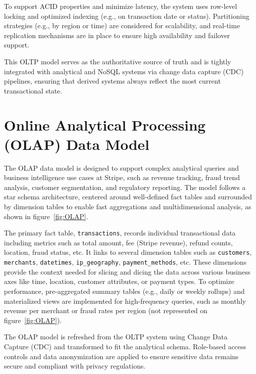 \documentclass[11pt,a4paper,computermodern]{article}
\newcommand{\code}{\texttt}
\begin{document}
To support ACID properties and minimize latency, the system uses row-level locking and optimized indexing (e.g., on transaction date or status). Partitioning strategies (e.g., by region or time) are considered for scalability, and real-time replication mechanisms are in place to ensure high availability and failover support.

This OLTP model serves as the authoritative source of truth and is tightly integrated with analytical and NoSQL systems via change data capture (CDC) pipelines, ensuring that derived systems always reflect the most current transactional state.


\clearpage
\section*{Online Analytical Processing (OLAP) Data Model}

The OLAP data model is designed to support complex analytical queries and business intelligence use cases at Stripe, such as revenue tracking, fraud trend analysis, customer segmentation, and regulatory reporting. The model follows a star schema architecture, centered around well-defined fact tables and surrounded by dimension tables to enable fast aggregations and multidimensional analysis, as shown in figure~\ref{fig:OLAP}.

The primary fact table, \code{transactions}, records individual transactional data including metrics such as total amount, fee (Stripe revenue), refund counts, location, fraud status, etc. It links to several dimension tables such as \code{customers}, \code{merchants}, \code{datetimes}, \code{ip\_geography}, \code{payment\_methods}, etc. These dimensions provide the context needed for slicing and dicing the data across various business axes like time, location, customer attributes, or payment types. To optimize performance, pre-aggregated summary tables (e.g., daily or weekly rollups) and materialized views are implemented for high-frequency queries, such as monthly revenue per merchant or fraud rates per region (not represented on figure~\ref{fig:OLAP}).

The OLAP model is refreshed from the OLTP system using Change Data Capture (CDC) and transformed to fit the analytical schema. Role-based access controls and data anonymization are applied to ensure sensitive data remains secure and compliant with privacy regulations.
\end{document}
